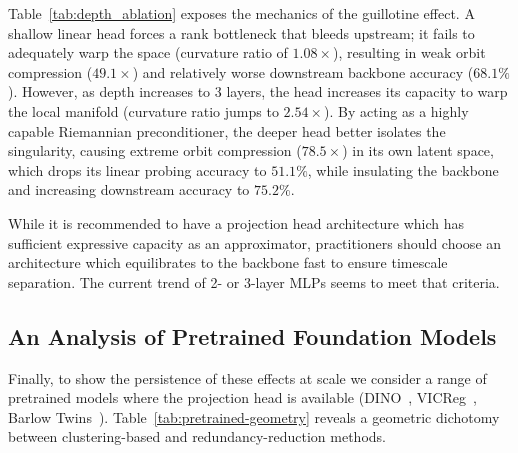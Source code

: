 \documentclass{article}
\theoremstyle{plain}
\theoremstyle{definition}
\theoremstyle{remark}
\begin{document}
Table~\ref{tab:depth_ablation} exposes the mechanics of the guillotine effect. A shallow linear head forces a rank bottleneck that bleeds upstream; it fails to adequately warp the space (curvature ratio of $1.08\times$), resulting in weak orbit compression ($49.1\times$) and relatively worse downstream backbone accuracy ($68.1\%$). However, as depth increases to 3 layers, the head increases its capacity to warp the local manifold (curvature ratio jumps to $2.54\times$). By acting as a highly capable Riemannian preconditioner, the deeper head better isolates the singularity, causing extreme orbit compression ($78.5\times$) in its own latent space, which drops its linear probing accuracy to $51.1\%$, while insulating the backbone and increasing downstream accuracy to $75.2\%$. 

While it is recommended to have a projection head architecture which has sufficient expressive capacity as an approximator, practitioners should choose an architecture which equilibrates to the backbone fast to ensure timescale separation. The current trend of 2- or 3-layer MLPs seems to meet that criteria.


\subsection{An Analysis of Pretrained Foundation Models}
\label{app:pretrained}

Finally, to show the persistence of these effects at scale we consider a range of pretrained models where the projection head is available (DINO~\citep{caron2021emerging}, VICReg~\citep{bardes2022vicreg}, Barlow Twins~\citep{zbontar2021barlow}). Table~\ref{tab:pretrained-geometry} reveals a geometric dichotomy between clustering-based and redundancy-reduction methods.
\end{document}
